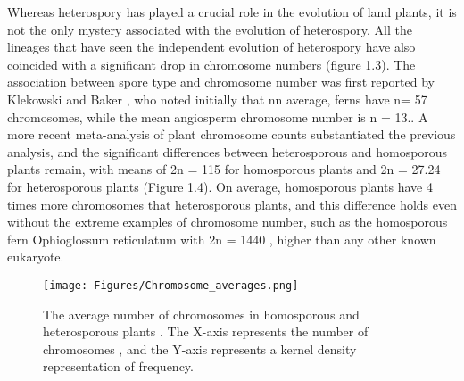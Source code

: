 Whereas heterospory has played a crucial role in the evolution of land plants, it is not the only mystery associated with the evolution of heterospory. All the lineages that have seen the independent evolution of heterospory have also coincided with a significant drop in chromosome numbers (figure 1.3). The association between spore type and chromosome number was first reported by Klekowski and Baker \cite{Klekowski1966-zg}, who noted initially that nn average, ferns have n= 57 chromosomes, while the mean angiosperm chromosome number is n = 13.. A more recent meta-analysis of plant chromosome counts \cite{Kinosian2022-uf} substantiated the previous analysis, and the significant differences between heterosporous and homosporous plants remain, with means of 2n = 115 for homosporous plants and 2n = 27.24 for heterosporous plants (Figure 1.4). On average, homosporous plants have 4 times more chromosomes that heterosporous plants, and this difference holds even without the extreme examples of chromosome number, such as the homosporous fern Ophioglossum reticulatum  with 2n = 1440 \cite{Khandelwal1990-nk}, higher than any other known eukaryote.  

\begin{figure}[ht]
    \centering
    \texttt{[image: Figures/Chromosome\_averages.png]}
    \caption[The average number of chromosomes in homosporous and heterosporous plants \cite{Kinosian2022-uf}. The X-axis represents the number of chromosomes , and the Y-axis represents a kernel density representation of frequency.
    ]{The average number of chromosomes in homosporous and heterosporous plants \cite{Kinosian2022-uf}. The X-axis represents the number of chromosomes , and the Y-axis represents a kernel density representation of frequency.
    }
    \label{fig 1.4}
\end{figure}

